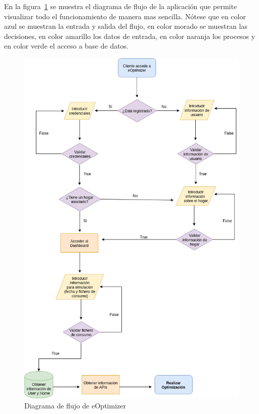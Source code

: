 En la figura~\ref{fig:diagrama-flujo} se muestra el diagrama de flujo de la aplicación que permite visualizar todo el funcionamiento de manera mas sencilla. Nótese que en color azul se muestran la entrada y salida del flujo, en color morado se muestran las decisiones, en color amarillo los datos de entrada, en color naranja los procesos y en color verde el acceso a base de datos.\\
\begin{figure}[H]
            \centering
            \includegraphics[width=15cm]{figs/diagrama_flujo.png}
            \caption{Diagrama de flujo de eOptimizer}
            \label{fig:diagrama-flujo}
\end{figure}

